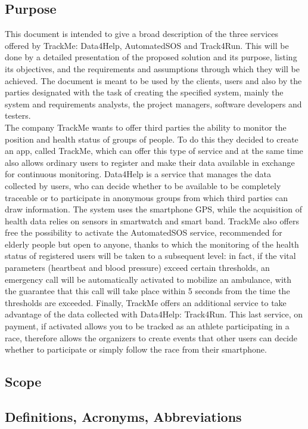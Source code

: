 
%

\subsection{Purpose}
This document is intended to give a broad description of the three services offered by TrackMe: Data4Help, AutomatedSOS and Track4Run. This will be done by a detailed presentation of the proposed solution and its purpose, listing its objectives, and the requirements and assumptions through which they will be achieved. The document is meant to be used by the clients, users and also by the parties designated with the task of creating the specified system, mainly the system and requirements analysts, the project managers, software developers and testers.\newline
\\
The company TrackMe wants to offer third parties the ability to monitor the position and health status of groups of people. To do this they decided to create an app, called TrackMe, which can offer this type of service and at the same time also allows ordinary users to register and make their data available in exchange for continuous monitoring. Data4Help is a service that manages the data collected by users, who can decide whether to be available to be completely traceable or to participate in anonymous groups from which third parties can draw information. The system uses the smartphone GPS, while the acquisition of health data relies on sensors in smartwatch and smart band. TrackMe also offers free the possibility to activate the AutomatedSOS service, recommended for elderly people but open to anyone, thanks to which the monitoring of the health status of registered users will be taken to a subsequent level: in fact, if the vital parameters (heartbeat and blood pressure) exceed certain thresholds, an emergency call will be automatically activated to mobilize an ambulance, with the guarantee that this call will take place within 5 seconds from the time the thresholds are exceeded. Finally, TrackMe offers an additional service to take advantage of the data collected with Data4Help: Track4Run. This last service, on payment, if activated allows you to be tracked as an athlete participating in a race, therefore allows the organizers to create events that other users can decide whether to participate or simply follow the race from their smartphone.

\subsection{Scope}
\subsection{Definitions, Acronyms, Abbreviations}
%
